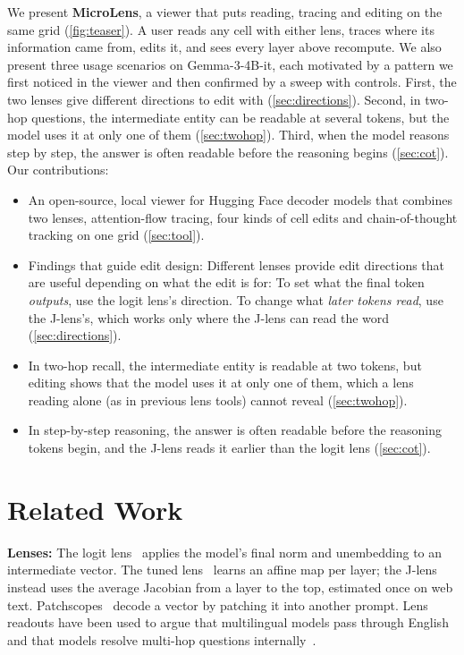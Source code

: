 \documentclass{vgtc}       %
\newcommand{\LL}{logit lens}
\newcommand{\JL}{J-lens}
\begin{document}
We present \textbf{MicroLens}, a viewer that puts reading, tracing and editing on the same grid (\cref{fig:teaser}). A user
reads any cell with either lens, traces where its information came from, edits it, and sees every layer above
recompute. We also present three usage scenarios on Gemma-3-4B-it, each motivated by a pattern we first noticed in the viewer
and then confirmed by a sweep with controls. First, the two lenses give different directions to edit with
(\cref{sec:directions}). Second, in two-hop questions, the intermediate entity can be readable at several tokens, but the model uses it at
only one of them (\cref{sec:twohop}). Third, when the model reasons step by step, the answer is often readable
before the reasoning begins (\cref{sec:cot}). Our contributions:
\begin{itemize}
  \item An open-source, local viewer for Hugging Face decoder models that combines two lenses, attention-flow
        tracing, four kinds of cell edits and chain-of-thought tracking on one grid (\cref{sec:tool}).
  \item Findings that guide edit design: Different lenses provide edit directions that are useful depending on what the edit is for: To set
    what the final token \emph{outputs}, use the \LL's direction. To change what \emph{later tokens read}, use the
    \JL's, which works only where the \JL{} can read the word (\cref{sec:directions}).
    \item In two-hop recall, the intermediate entity is readable at two tokens, but editing shows that the model uses
        it at only one of them, which a lens reading alone (as in previous lens tools) cannot reveal (\cref{sec:twohop}).
    \item In step-by-step reasoning, the answer is often readable before the reasoning tokens begin, and the \JL{} reads
        it earlier than the \LL{} (\cref{sec:cot}).
\end{itemize}

\section{Related Work}
\;\;
\textbf{Lenses:} The \LL~\cite{nostalgebraist2020} applies the model's final norm and unembedding to an intermediate
vector. The tuned lens~\cite{belrose2023tuned} learns an affine map per layer; the \JL~\cite{workspace2026} instead
uses the average Jacobian from a layer to the top, estimated once on web text. Patchscopes~\cite{ghandeharioun2024patchscopes}
decode a vector by patching it into another prompt. Lens readouts have been used to argue that multilingual models
pass through English~\cite{wendler2024llamas} and that models resolve multi-hop questions
internally~\cite{yang2024multihop, biran2024hopping}.
\end{document}
